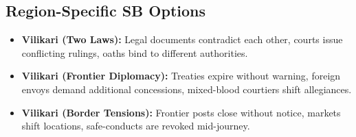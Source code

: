\subsection*{Region-Specific SB Options}
\begin{itemize}
\item \textbf{Vilikari (Two Laws):} Legal documents contradict each other, courts issue conflicting rulings, oaths bind to different authorities.
\item \textbf{Vilikari (Frontier Diplomacy):} Treaties expire without warning, foreign envoys demand additional concessions, mixed-blood courtiers shift allegiances.
\item \textbf{Vilikari (Border Tensions):} Frontier posts close without notice, markets shift locations, safe-conducts are revoked mid-journey.
\end{itemize}
